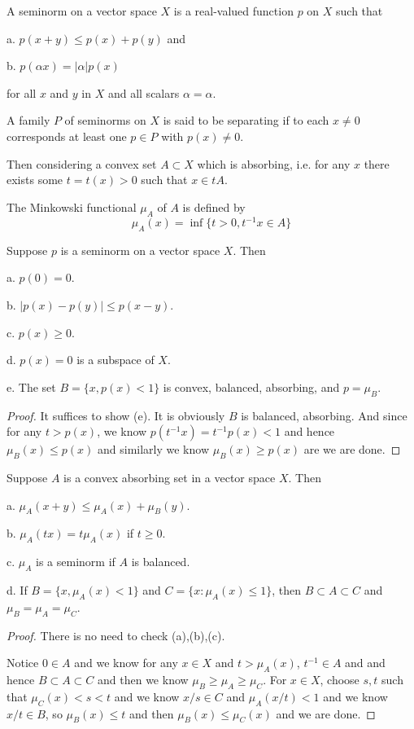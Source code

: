 \begin{definition}
    A seminorm on a vector space $X$ is a real-valued function $p$ on $X$ such that\par
    a. $p(x+y) \leq p(x) + p(y)$ and\par
    b. $p(\alpha x) = |\alpha|p(x)$\par
    for all $x$ and $y$ in $X$ and all scalars $\alpha = \alpha$.\par
    A family $P$ of seminorms on $X$ is said to be separating if to each $x\neq 0$ corresponds at least one $p\in P$ with $p(x) \neq 0$.\par
    Then considering a convex set $A\subset X$ which is absorbing, i.e. for any $x$ there exists some $t = t(x) > 0$ such that $x\in tA$.\par
    The Minkowski functional $\mu_A$ of $A$ is defined by
    \[\mu_A(x) = \inf\{t>0, t^{-1}x \in A\}\]
\end{definition}

\begin{theorem}
    Suppose $p$ is a seminorm on a vector space $X$. Then\par
    a. $p(0) = 0$.\par
    b. $|p(x)-p(y)| \leq p(x-y)$.\par
    c. $p(x) \geq 0$.\par
    d. $p(x) = 0$ is a subspace of $X$.\par
    e. The set $B = \{x,p(x) < 1\}$ is convex, balanced, absorbing, and $p = \mu_B$. 
\end{theorem}
\begin{proof}
    It suffices to show (e). It is obviously $B$ is balanced, absorbing. And since for any $t > p(x)$, we know $p(t^{-1}x) = t^{-1}p(x) < 1$ and hence $\mu_B(x) \leq p(x)$ and similarly we know $\mu_B(x) \geq p(x)$ are we are done.
\end{proof}

\begin{theorem}
    Suppose $A$ is a convex absorbing set in a vector space $X$. Then\par
    a. $\mu_A(x+y) \leq \mu_A(x) + \mu_B(y)$.\par
    b. $\mu_A(tx) = t\mu_A(x)$ if $t\geq 0$.\par
    c. $\mu_A$ is a seminorm if $A$ is balanced.\par
    d. If $B = \{x, \mu_A(x) < 1\}$ and $C = \{x:\mu_A(x) \leq 1\}$, then $B\subset A\subset C$ and $\mu_B = \mu_A = \mu_C$.
\end{theorem}
\begin{proof}
    There is no need to check (a),(b),(c).\par
    Notice $0 \in A$ and we know for any $x\in X$ and $t>\mu_A(x)$, $t^{-1} \in A$ and and hence $B\subset A \subset C$ and then we know $\mu_B \geq \mu_A \geq \mu_C$. For $x\in X$, choose $s,t$ such that $\mu_C(x) < s < t$ and we know $x/s \in C$ and $\mu_A(x/t) < 1$ and we know $x/t \in B$, so $\mu_B(x) \leq t$ and then $\mu_B(x) \leq \mu_C(x)$ and we are done.
\end{proof}

